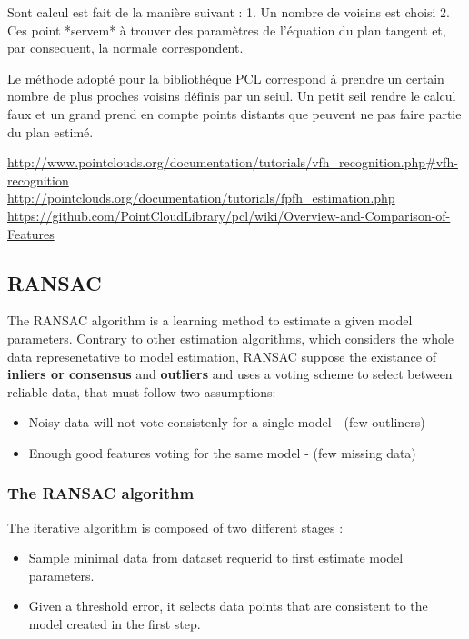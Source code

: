 Sont calcul est fait de la manière suivant :
1. Un nombre de voisins est choisi 
2. Ces point *servem* à trouver des paramètres de l'équation du plan tangent et, par consequent, la normale correspondent.

Le méthode adopté pour la bibliothéque PCL correspond à prendre un certain nombre de plus proches voisins définis par un seiul. Un petit seil rendre le calcul faux et un grand prend en compte points distants que peuvent ne pas faire partie du plan estimé.

\url{http://www.pointclouds.org/documentation/tutorials/vfh_recognition.php#vfh-recognition} \\

\url{http://pointclouds.org/documentation/tutorials/fpfh_estimation.php} \\

\url{https://github.com/PointCloudLibrary/pcl/wiki/Overview-and-Comparison-of-Features} \\

\subsection { RANSAC } 

The RANSAC algorithm is a learning method to estimate a given model parameters. Contrary to other estimation algorithms, which considers the whole data represenetative to model estimation, RANSAC suppose the existance of \textbf{inliers or consensus} and \textbf{outliers}  and uses a voting scheme to select between reliable data, that must follow two assumptions: 

\begin{itemize}
\item Noisy data will not vote consistenly for a single model - (few outliners) 
\item Enough good features voting for the same model - (few missing data)
\end{itemize}

\subsubsection{The RANSAC algorithm}

The iterative algorithm is composed of two different stages : 
\begin {itemize}
\item Sample minimal data from dataset requerid to first estimate model parameters.
\item Given a threshold error, it selects data points that are consistent to the model created in the first step.
\end {itemize}

